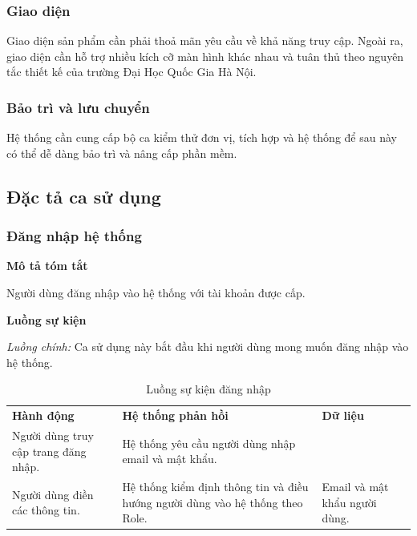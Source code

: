 \documentclass[./../main.tex]{subfiles}
\begin{document}
\hypertarget{giao-diux1ec7n}{%
\subsubsection{Giao diện}\label{giao-diux1ec7n}}

Giao diện sản phẩm cần phải thoả mãn yêu cầu về khả năng truy cập. Ngoài
ra, giao diện cần hỗ trợ nhiều kích cỡ màn hình khác nhau và tuân thủ
theo nguyên tắc thiết kế của trường Đại Học Quốc Gia Hà Nội.

\hypertarget{bux1ea3o-truxec-vuxe0-lux1b0u-chuyux1ec3n}{%
\subsubsection{Bảo trì và lưu
chuyển}\label{bux1ea3o-truxec-vuxe0-lux1b0u-chuyux1ec3n}}

Hệ thống cần cung cấp bộ ca kiểm thử đơn vị, tích hợp và hệ thống để sau
này có thể dễ dàng bảo trì và nâng cấp phần mềm.

\subsection{Đặc tả ca sử dụng}

\hypertarget{ux111ux103ng-nhux1eadp-hux1ec7-thux1ed1ng-1}{%
\subsubsection{Đăng nhập hệ
thống}\label{ux111ux103ng-nhux1eadp-hux1ec7-thux1ed1ng-1}}

\textbf{Mô tả tóm tắt}

Người dùng đăng nhập vào hệ thống với tài khoản được cấp.

\textbf{Luồng sự kiện}

\emph{Luồng chính:} Ca sử dụng này bắt đầu khi người dùng mong muốn đăng
nhập vào hệ thống.

\begin{table}[]
  \begin{tabular}{|l|l|l}
  \cline{1-2}
  \textbf{Hành động}                   & \textbf{Hệ thống phản hồi}                                                    & \textbf{Dữ liệu}              \\ \cline{1-2}
  Người dùng truy cập trang đăng nhập. & Hệ thống yêu cầu người dùng nhập email và mật khẩu.                           &                               \\ \cline{1-2}
  Người dùng điền các thông tin.       & Hệ thống kiểm định thông tin và điều hướng người dùng vào hệ thống theo Role. & Email và mật khẩu người dùng. \\ \cline{1-2}
  \end{tabular}
  \caption{Luồng sự kiện đăng nhập }
  \label{tab:my-table}
  \end{table}
\end{document}
